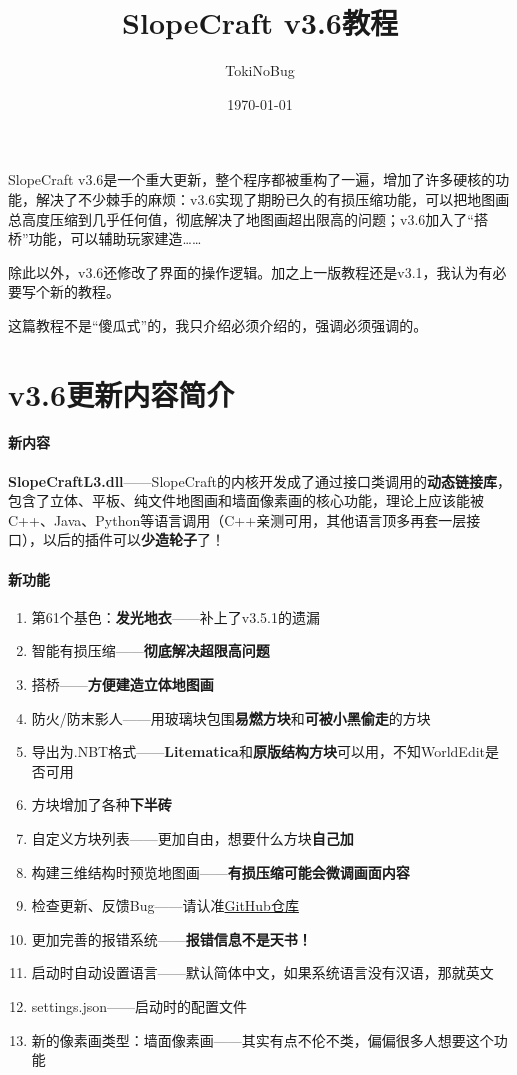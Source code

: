 \documentclass[UTF8]{ctexart}
\title{SlopeCraft v3.6教程}
\author{TokiNoBug}
\date{\today}
\begin{document}
    \maketitle
    SlopeCraft v3.6是一个重大更新，整个程序都被重构了一遍，增加了许多硬核的功能，解决了不少棘手的麻烦：v3.6实现了期盼已久的有损压缩功能，可以把地图画总高度压缩到几乎任何值，彻底解决了地图画超出限高的问题；v3.6加入了“搭桥”功能，可以辅助玩家建造……
    
    除此以外，v3.6还修改了界面的操作逻辑。加之上一版教程还是v3.1，我认为有必要写个新的教程。

    这篇教程不是“傻瓜式”的，我只介绍必须介绍的，强调必须强调的。

    \pagebreak
    \section{v3.6更新内容简介}
    \paragraph{新内容}
    \textbf{SlopeCraftL3.dll}——SlopeCraft的内核开发成了通过接口类调用的\textbf{动态链接库}，包含了立体、平板、纯文件地图画和墙面像素画的核心功能，理论上应该能被C++、Java、Python等语言调用（C++亲测可用，其他语言顶多再套一层接口），以后的插件可以\textbf{少造轮子}了！

    \paragraph{新功能}
    \begin{enumerate}
        \item 第61个基色：\textbf{发光地衣}——补上了v3.5.1的遗漏
        \item 智能有损压缩——\textbf{彻底解决超限高问题}
        \item 搭桥——\textbf{方便建造立体地图画}
        \item 防火/防末影人——用玻璃块包围\textbf{易燃方块}和\textbf{可被小黑偷走}的方块
        \item 导出为.NBT格式——\textbf{Litematica}和\textbf{原版结构方块}可以用，不知WorldEdit是否可用
        \item 方块增加了各种\textbf{下半砖}
        \item 自定义方块列表——更加自由，想要什么方块\textbf{自己加}
        \item 构建三维结构时预览地图画——\textbf{有损压缩可能会微调画面内容}
        \item 检查更新、反馈Bug——请认准\href{https://github.com/ToKiNoBug/SlopeCraft}{GitHub仓库}
        \item 更加完善的报错系统——\textbf{报错信息不是天书！}
        \item 启动时自动设置语言——默认简体中文，如果系统语言没有汉语，那就英文
        \item settings.json——启动时的配置文件
        \item 新的像素画类型：墙面像素画——其实有点不伦不类，偏偏很多人想要这个功能
    \end{enumerate}
\end{document}
